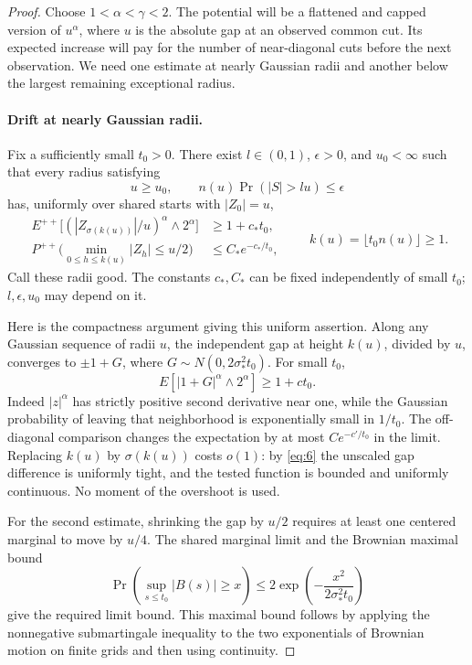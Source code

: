 \begin{proof}
Choose \(1<\alpha<\gamma<2\). The potential will be a flattened and
capped version of \(u^\alpha\), where \(u\) is the absolute gap at an
observed common cut. Its expected increase will pay for the number of
near-diagonal cuts before the next observation. We need one estimate
at nearly Gaussian radii and another below the largest remaining
exceptional radius.

\paragraph{Drift at nearly Gaussian radii.}
Fix a sufficiently small \(t_0>0\). There exist \(l\in(0,1)\),
\(\epsilon>0\), and \(u_0<\infty\) such that every radius satisfying
\[
u\ge u_0,\qquad n(u)\Pr(|S|>lu)\le\epsilon
\]
has, uniformly over shared starts with \(|Z_0|=u\),
\[
\begin{split}
E^{++}\big[(|Z_{\sigma(k(u))}|/u)^\alpha\wedge2^\alpha\big]
 &\ge1+c_*t_0,\\
P^{++}\big(\min_{0\le h\le k(u)}|Z_h|\le u/2\big)
 &\le C_*e^{-c_*/t_0},
\end{split}
\qquad k(u)=\lfloor t_0n(u)\rfloor\ge1.
\tag{19}\label{eq:19}
\]
Call these radii good. The constants \(c_*,C_*\) can be fixed
independently of small \(t_0\); \(l,\epsilon,u_0\) may depend on it.

Here is the compactness argument giving this uniform assertion. Along
any Gaussian sequence of radii \(u\), the independent gap at height
\(k(u)\), divided by \(u\), converges to \(\pm1+G\), where
\(G\sim N(0,2\sigma_*^2t_0)\). For small \(t_0\),
\[
E[|1+G|^\alpha\wedge2^\alpha]\ge1+ct_0.
\]
Indeed \(|z|^\alpha\) has strictly positive second derivative near
one, while the Gaussian probability of leaving that neighborhood is
exponentially small in \(1/t_0\). The off-diagonal comparison changes
the expectation by at most \(Ce^{-c'/t_0}\) in the limit. Replacing
\(k(u)\) by \(\sigma(k(u))\) costs \(o(1)\): by \eqref{eq:6} the
unscaled gap difference is uniformly tight, and the tested function is
bounded and uniformly continuous. No moment of the overshoot is used.

For the second estimate, shrinking the gap by \(u/2\) requires at least
one centered marginal to move by \(u/4\). The shared marginal limit
and the Brownian maximal bound
\[
\Pr\left(\sup_{s\le t_0}|B(s)|\ge x\right)
\le2\exp\left(-\frac{x^2}{2\sigma_*^2t_0}\right)
\]
give the required limit bound. This maximal bound follows by applying
the nonnegative submartingale inequality to the two exponentials of
Brownian motion on finite grids and then using continuity.


\end{proof}
